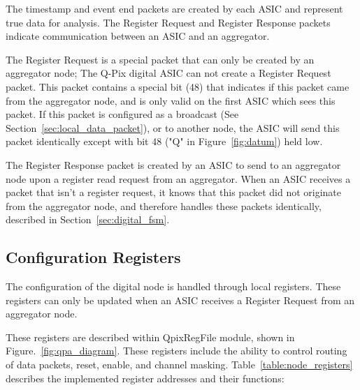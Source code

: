 The timestamp and event end packets are created by each ASIC and represent true data for analysis.
The Register Request and Register Response packets indicate communication between an ASIC and an aggregator.

The Register Request is a special packet that can only be created by an aggregator node; The Q-Pix digital ASIC can not create a Register Request packet.
This packet contains a special bit (48) that indicates if this packet came from the aggregator node, and is only valid on the first ASIC which sees this packet.
If this packet is configured as a broadcast (See Section~\ref{sec:local_data_packet}), or to another node, the ASIC will send this packet identically except with bit 48 ("Q" in Figure~\ref{fig:datum}) held low.

The Register Response packet is created by an ASIC to send to an aggregator node upon a register read request from an aggregator.
When an ASIC receives a packet that isn't a register request, it knows that this packet did not originate from the aggregator node, and therefore handles these packets identically, described in Section~\ref{sec:digital_fsm}.

\subsection{Configuration Registers}\label{sec:registers}
The configuration of the digital node is handled through local registers.
These registers can only be updated when an ASIC receives a Register Request from an aggregator node.

These registers are described within QpixRegFile module, shown in Figure.~\ref{fig:qpa_diagram}.
These registers include the ability to control routing of data packets, reset, enable, and channel masking.
Table~\ref{table:node_registers} describes the implemented register addresses and their functions:

